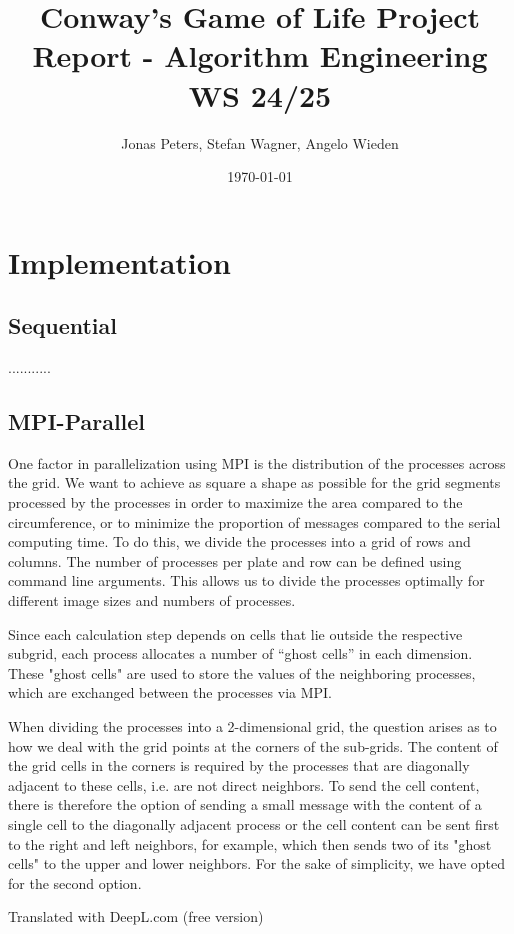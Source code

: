 \documentclass[11pt]{article}
\title{Conway's Game of Life Project Report - Algorithm Engineering WS 24/25}
\author{Jonas Peters, Stefan Wagner, Angelo Wieden}
\date{\today}
\begin{document}
\maketitle

\tableofcontents

\section{Implementation}

\subsection{Sequential}
...........

\subsection{MPI-Parallel}
One factor in parallelization using MPI is the distribution of the processes across the grid. We want to achieve as square a shape as possible for the grid segments processed by the processes in order to maximize the area compared to the circumference, or to minimize the proportion of messages compared to the serial computing time. To do this, we divide the processes into a grid of rows and columns. The number of processes per plate and row can be defined using command line arguments. This allows us to divide the processes optimally for different image sizes and numbers of processes. 

Since each calculation step depends on cells that lie outside the respective subgrid, each process allocates a number of “ghost cells” in each dimension. These "ghost cells" are used to store the values of the neighboring processes, which are exchanged between the processes via MPI. 

When dividing the processes into a 2-dimensional grid, the question arises as to how we deal with the grid points at the corners of the sub-grids. The content of the grid cells in the corners is required by the processes that are diagonally adjacent to these cells, i.e. are not direct neighbors. To send the cell content, there is therefore the option of sending a small message with the content of a single cell to the diagonally adjacent process or the cell content can be sent first to the right and left neighbors, for example, which then sends two of its "ghost cells" to the upper and lower neighbors. For the sake of simplicity, we have opted for the second option.

Translated with DeepL.com (free version)
\end{document}
